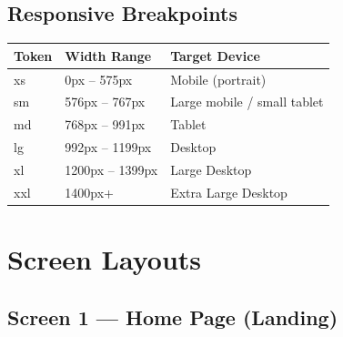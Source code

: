 \documentclass[a4paper,11pt]{article}
\begin{document}
\subsection{Responsive Breakpoints}

\begin{tabular}{@{}C{1.5cm}C{4cm}L{7cm}@{}}
\toprule
{}
\textbf{Token} & \textbf{Width Range} & \textbf{Target Device} \\
\midrule
xs & 0px -- 575px   & Mobile (portrait) \\
sm & 576px -- 767px & Large mobile / small tablet \\
md & 768px -- 991px & Tablet \\
lg & 992px -- 1199px& Desktop \\
xl & 1200px -- 1399px& Large Desktop \\
xxl & 1400px+       & Extra Large Desktop \\
\bottomrule
\end{tabular}

\section{Screen Layouts}

\subsection{Screen 1 — Home Page (Landing)}
\end{document}
